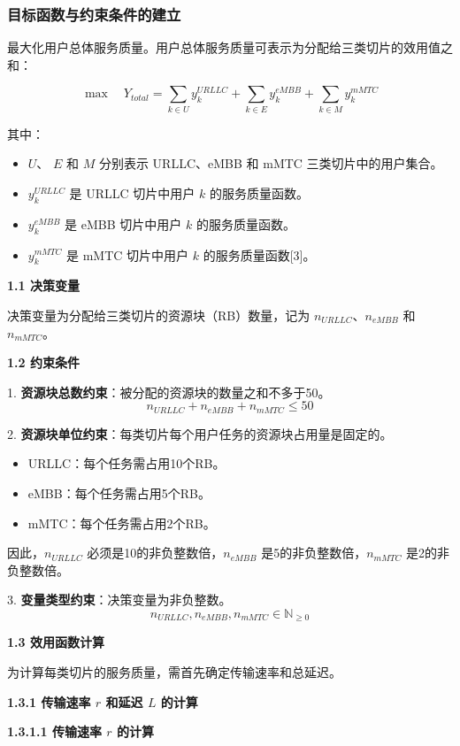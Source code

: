 \documentclass{ctexart}
\begin{document}
\subsubsection{目标函数与约束条件的建立}

最大化用户总体服务质量。用户总体服务质量可表示为分配给三类切片的效用值之和：

$$\max \quad Y_{total} = \sum_{k \in U} y_k^{URLLC} + \sum_{k \in E} y_k^{eMBB} + \sum_{k \in M} y_k^{mMTC}$$

其中：
\begin{itemize}
 \item $U$、 $E$ 和 $M$ 分别表示 URLLC、eMBB 和 mMTC 三类切片中的用户集合。
 \item $y_k^{URLLC}$ 是 URLLC 切片中用户 $k$ 的服务质量函数。
 \item $y_k^{eMBB}$ 是 eMBB 切片中用户 $k$ 的服务质量函数。
 \item $y_k^{mMTC}$ 是 mMTC 切片中用户 $k$ 的服务质量函数[3]。
\end{itemize}

\textbf{1.1 决策变量}

决策变量为分配给三类切片的资源块（RB）数量，记为 $n_{URLLC}$、$n_{eMBB}$ 和 $n_{mMTC}$。

\textbf{1.2 约束条件}

1. \textbf{资源块总数约束}：被分配的资源块的数量之和不多于50。
 $$n_{URLLC} + n_{eMBB} + n_{mMTC} \le 50$$

2. \textbf{资源块单位约束}：每类切片每个用户任务的资源块占用量是固定的。
 
 \begin{itemize}
 \item URLLC：每个任务需占用10个RB。
 \item eMBB：每个任务需占用5个RB。
 \item mMTC：每个任务需占用2个RB。
 \end{itemize}
 
 因此，$n_{URLLC}$ 必须是10的非负整数倍，$n_{eMBB}$ 是5的非负整数倍，$n_{mMTC}$ 是2的非负整数倍。
 


3. \textbf{变量类型约束}：决策变量为非负整数。
 $$n_{URLLC}, n_{eMBB}, n_{mMTC} \in \mathbb{N}_{\ge 0}$$

\textbf{1.3 效用函数计算}

为计算每类切片的服务质量，需首先确定传输速率和总延迟。

\textbf{1.3.1 传输速率 $r$ 和延迟 $L$ 的计算}

\textbf{1.3.1.1 传输速率 $r$ 的计算}
\end{document}
